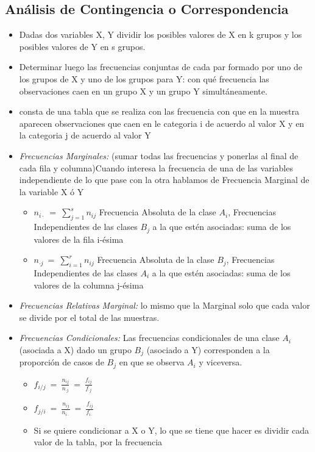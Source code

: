 \subsection{An\'alisis de Contingencia o Correspondencia}
	\begin{itemize}
		\item  Dadas dos variables X, Y dividir los posibles valores de X en k grupos y los posibles valores de Y en s grupos.
		\item  Determinar luego las frecuencias conjuntas de cada par formado por uno de los grupos de X y uno de los grupos
		 para Y: con qué frecuencia las observaciones caen en un grupo X y un grupo Y simultáneamente.
		\item consta de una tabla que se realiza con las frecuencia con que en la muestra aparecen observaciones que caen en le categoria
		i de acuerdo al valor X y en la categoria j de acuerdo al valor Y
		\item \emph{Frecuencias Marginales:} (sumar todas las frecuencias y ponerlas al final de cada fila y columna)Cuando interesa la frecuencia de una de
		 las variables independiente de lo que pase con la otra  hablamos de Frecuencia Marginal de la variable X \'o Y
		\begin{itemize}
			\item $n_{i\cdot}\ =\ \sum_{j=1}^{s}n_{ij}$ Frecuencia Absoluta de la clase $A_{i}$, Frecuencias Independientes de las clases $B_{j}$
			 a la que estén asociadas: suma de los valores de la fila i-\'esima 
			\item  $n_{\cdot j}\ =\ \sum_{i=1}^{r}n_{ij}$ Frecuencia Absoluta de la clase $B_{j}$, Frecuencias Independientes de las clases $A_{i}$
			 a la que estén asociadas: suma de los valores de la columna j-\'esima 
		\end{itemize}
		\item \emph{Frecuencias Relativas Marginal:} lo mismo que la Marginal solo que cada valor se divide por el total de las muestras.
		\item \emph{Frecuencias Condicionales:} Las frecuencias condicionales de una clase $A_i$ (asociada a X) dado un grupo $B_j$
		 (asociado a Y) corresponden a la proporci\'on de casos de $B_j$ en que se observa $A_i$ y viceversa.
		\begin{itemize}
			\item $f_{i/j}\ =\ \frac{n_{ij}}{n_{\cdot j}}\ =\ \frac{f_{ij}}{f_{\cdot j}}$
			\item $f_{j/i}\ =\ \frac{n_{ij}}{n_{i\cdot}}\ =\ \frac{f_{ij}}{f_{i\cdot}}$
			\item Si se quiere condicionar a X o Y, lo que se tiene que hacer es dividir cada valor de la tabla, por la frecuencia

\end{itemize}
\end{itemize}
